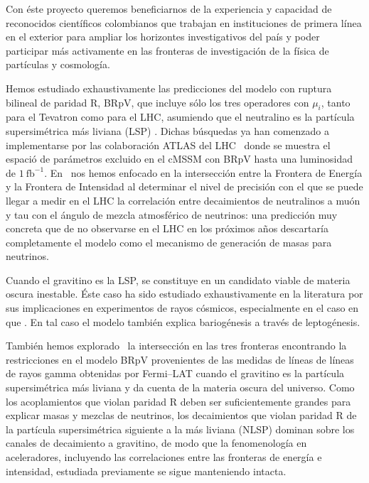 Con éste proyecto queremos beneficiarnos de la experiencia y capacidad
de reconocidos científicos colombianos que trabajan en instituciones
de primera línea en el exterior para ampliar los horizontes
investigativos del país y poder participar más activamente en las
fronteras de investigación de la física de partículas y cosmología.


Hemos estudiado exhaustivamente las predicciones del modelo con
ruptura bilineal de paridad R, BRpV, que incluye sólo los tres
operadores con $\mu_i$, tanto para el Tevatron como
para el LHC, asumiendo que el neutralino es la partícula
supersimétrica más liviana (LSP)
\cite{Magro:2003zb,deCampos:2005ri,deCampos:2007bn,deCampos:2008ic,deCampos:2008re,DeCampos:2010yu}. Dichas
búsquedas ya han comenzado a implementarse por las colaboración ATLAS
del LHC~\cite{:2011iu} donde se muestra el espació de parámetros
excluido en el cMSSM con BRpV hasta una luminosidad de $1\
\text{fb}^{-1}$.  En~\cite{DeCampos:2010yu} nos hemos enfocado en la
intersección entre la Frontera de Energía y la Frontera de Intensidad
al determinar el nivel de precisión con el que se puede llegar a medir
en el LHC la correlación entre decaimientos de neutralinos a muón y
tau con el ángulo de mezcla atmosférico de neutrinos: una predicción
muy concreta que de no observarse en el LHC en los próximos años
descartaría completamente el modelo como el mecanismo de generación de
masas para neutrinos. 

Cuando el gravitino es la LSP, se constituye en un candidato viable de
materia oscura inestable. Éste caso ha sido estudiado exhaustivamente
en la literatura por sus implicaciones en experimentos de rayos
cósmicos, especialmente en el caso en que . En tal caso el modelo
también explica bariogénesis a través de leptogénesis. 



También hemos explorado~\cite{} la intersección en
las tres fronteras encontrando la restricciones en el modelo BRpV
provenientes de las medidas de líneas de líneas de rayos gamma
obtenidas por Fermi--LAT cuando el gravitino es la partícula
supersimétrica más liviana y da cuenta de la materia oscura del
universo. Como los acoplamientos que violan paridad R deben ser
suficientemente grandes para explicar masas y mezclas de neutrinos,
los decaimientos que violan paridad R de la partícula supersimétrica
siguiente a la más liviana (NLSP) dominan sobre los canales de
decaimiento a gravitino, de modo que la fenomenología en aceleradores,
incluyendo las correlaciones entre las fronteras de energía e
intensidad, estudiada previamente se sigue manteniendo intacta.

